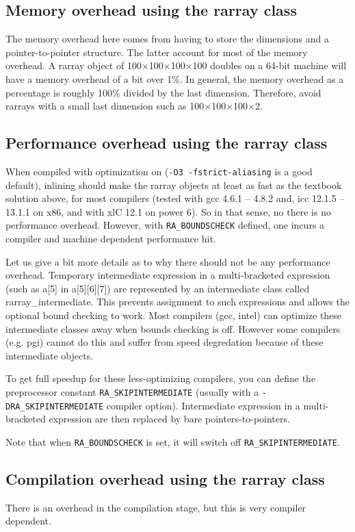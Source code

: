 \documentclass[11pt,twoside]{article}
\begin{document}
\subsection{Memory overhead using the rarray class}

The memory overhead here comes from having to store the dimensions and a pointer-to-pointer structure.  The latter account for most of the memory overhead.   A rarray object of 100$\times$100$\times$100$\times$100  doubles on a 64-bit machine will have a memory overhead of a bit over 1\%. In general, the memory overhead as a percentage is roughly 100\% divided by the last dimension. Therefore, avoid rarrays with a small last dimension such as 100$\times$100$\times$100$\times$2.

\subsection{Performance overhead using the rarray class}

When compiled with optimization on (\texttt{-O3 -fstrict-aliasing} is a good default), inlining should make the rarray objects at least as fast as the textbook solution above, for most compilers (tested with gcc 4.6.1 -- 4.8.2 and, icc 12.1.5 -- 13.1.1 on x86, and with xlC 12.1 on power 6).
So in that sense, no there is no performance overhead.  However, with \texttt{{\tt RA\_BOUNDSCHECK}} defined, one incurs a compiler and machine dependent performance hit.

Let us give a bit more details as to why there should not be any performance overhead. Temporary intermediate expression in a multi-bracketed expression (such as a[5] in a[5][6][7]) are represented by an intermediate class called rarray\_intermediate. This prevents assignment to such expressions and allows the optional bound checking to work.  Most compilers (gcc, intel) can optimize these intermediate classes away when bounds checking is off. However
some compilers (e.g. pgi) cannot do this and suffer from speed degredation because of these intermediate objects.

To get full speedup for these less-optimizing compilers, you can define the preprocessor constant \texttt{RA\_SKIPINTERMEDIATE} (usually with a \texttt{-DRA\_SKIPINTERMEDIATE} compiler option).  Intermediate expression in a multi-bracketed expression are then replaced by bare pointers-to-pointers.

Note that when \texttt{RA\_BOUNDSCHECK} is set, it will switch off \texttt{RA\_SKIPINTERMEDIATE}.

\subsection{Compilation overhead using the rarray class}

There is an overhead in the compilation stage, but this is very compiler dependent.
\end{document}
